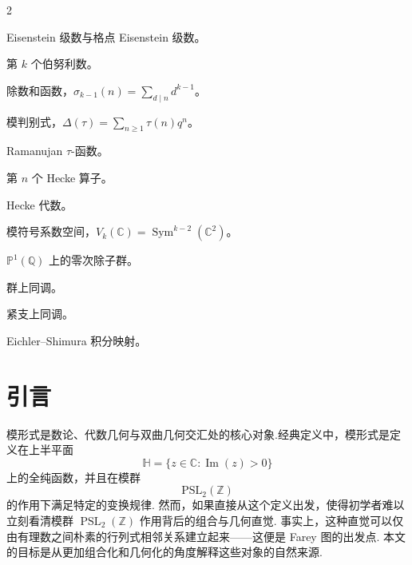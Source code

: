 \documentclass[10pt,UTF8]{ctexart}
\theoremstyle{definition}
\theoremstyle{remark}
\begin{document}
\begin{multicols}{2}
\begin{description}[leftmargin=2.8cm, labelwidth=2.5cm, style=nextline]
\item[\(E_k,G_k\)]
Eisenstein 级数与格点 Eisenstein 级数。

\item[\(B_k\)]
第 \(k\) 个伯努利数。

\item[\(\sigma_{k-1}(n)\)]
除数和函数，\(\sigma_{k-1}(n)=\sum_{d\mid n}d^{k-1}\)。

\item[\(\Delta(\tau)\)]
模判别式，\(\Delta(\tau)=\sum_{n\geq1}\tau(n)q^n\)。

\item[\(\tau(n)\)]
Ramanujan \(\tau\)-函数。

\item[\(T_n\)]
第 \(n\) 个 Hecke 算子。

\item[\(\mathbb T\)]
Hecke 代数。

\item[\(V_k(\mathbb C)\)]
模符号系数空间，\(V_k(\mathbb C)=\operatorname{Sym}^{k-2}(\mathbb C^2)\)。

\item[\(\Delta^0\)]
\(\mathbb P^1(\mathbb Q)\) 上的零次除子群。

\item[\(H^1(\Gamma,V_k)\)]
群上同调。

\item[\(H_c^1(\Gamma,V_k)\)]
紧支上同调。

\item[\(\phi_k(f)\)]
Eichler--Shimura 积分映射。

\end{description}

\end{multicols}
\endgroup

\newpage
\section{引言}



模形式是数论、代数几何与双曲几何交汇处的核心对象.经典定义中，模形式是定义在上半平面
\[
\mathbb H=\{z\in\mathbb C:\operatorname{Im}(z)>0\}
\]
上的全纯函数，并且在模群
\[
\mathrm{PSL}_2(\mathbb Z)
\]
的作用下满足特定的变换规律. 然而，如果直接从这个定义出发，使得初学者难以立刻看清模群 $\operatorname{PSL}_2(\mathbb Z)$ 作用背后的组合与几何直觉. 事实上，这种直觉可以仅由有理数之间朴素的行列式相邻关系建立起来——这便是 Farey 图的出发点. 本文的目标是从更加组合化和几何化的角度解释这些对象的自然来源.
\end{document}
